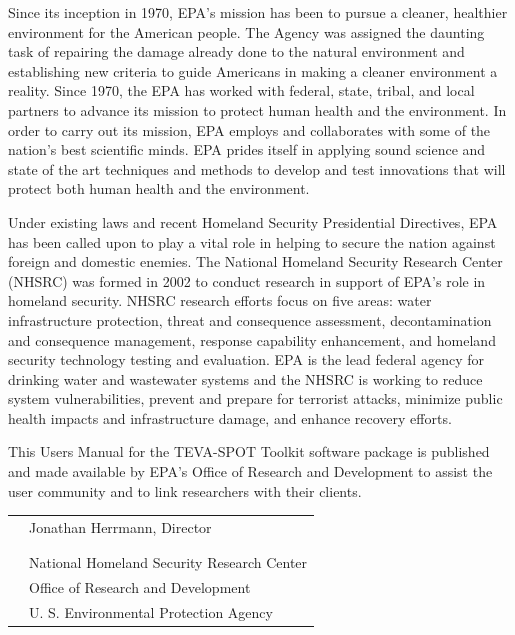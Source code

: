 Since its inception in 1970, EPA's mission has been to pursue a
cleaner, healthier environment for the American people. The Agency was
assigned the daunting task of repairing the damage already done to the
natural environment and establishing new criteria to guide Americans
in making a cleaner environment a reality. Since 1970, the EPA has
worked with federal, state, tribal, and local partners to advance its
mission to protect human health and the environment. In order to carry
out its mission, EPA employs and collaborates with some of the
nation's best scientific minds. EPA prides itself in applying sound
science and state of the art techniques and methods to develop and
test innovations that will protect both human health and the
environment.

Under existing laws and recent Homeland Security Presidential
Directives, EPA has been called upon to play a vital role in helping
to secure the nation against foreign and domestic enemies.  The
National Homeland Security Research Center (NHSRC) was formed in 2002
to conduct research in support of EPA's role in homeland
security. NHSRC research efforts focus on five areas: water
infrastructure protection, threat and consequence assessment,
decontamination and consequence management, response capability
enhancement, and homeland security technology testing and
evaluation. EPA is the lead federal agency for drinking water and
wastewater systems and the NHSRC is working to reduce system
vulnerabilities, prevent and prepare for terrorist attacks, minimize
public health impacts and infrastructure damage, and enhance recovery
efforts. 

This Users Manual for the TEVA-SPOT Toolkit software package is published and
made available by EPA's Office of Research and Development to
assist the user community and to link researchers with their clients. 
\vspace*{\baselineskip}
\vspace*{\baselineskip}

\begin{tabular}{ll}
 & Jonathan Herrmann, Director \\
\\
\\
& National Homeland Security Research Center \\
& Office of Research and Development \\
& U. S. Environmental Protection Agency
\end{tabular}
